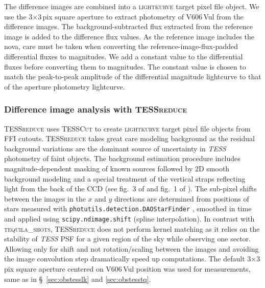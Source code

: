 \documentclass[twocolumn]{aastex631}
\newcommand{\nova}{V606\,Vul}
\begin{document}
The difference images are combined into a \textsc{lightkurve} target pixel file object. 
%
We use the 3$\times$3\,pix square aperture to extract photometry of \nova{} from the difference images.
%
The background-subtracted flux extracted from the reference image is added to the difference flux values.
As the reference image includes the nova, care must be taken when converting 
the reference-image-flux-padded differential fluxes to magnitudes. 
We add a constant value to the differential fluxes before converting them to magnitudes. 
The constant value is chosen to match the peak-to-peak amplitude of 
the differential magnitude lightcurve to that of the aperture photometry lightcurve. 


\subsubsection{Difference image analysis with \textsc{TESSreduce}}
\label{sec:obstesstr}

\textsc{TESSreduce} \citep{2021arXiv211115006R} 
uses \textsc{TESSCut} to create \textsc{lightkurve} target pixel file
objects from FFI cutouts. 
\textsc{TESSreduce} takes great care modeling background 
as the residual background variations are the dominant source of uncertainty
in {\em TESS} photometry of faint objects. The background estimation
procedure includes magnitude-dependent masking of known sources followed by
2D smooth background modeling and a special treatment of the vertical straps 
reflecting light from the back of the CCD (see fig.~3 of \citealt{2021arXiv211115006R}
and fig.~1 of \citealt{2021MNRAS.500.5639V}).
The sub-pixel shifts between the images in the $x$ and $y$ directions are
determined from positions of stars measured with 
\texttt{photutils.detection.DAOStarFinder} \citep[implementing the algorithm of][]{1987PASP...99..191S},
smoothed in time \citep[see fig.~4 of][]{2021arXiv211115006R} and applied using \texttt{scipy.ndimage.shift} (spline interpolation).
In contrast with \textsc{tequila\_shots}, \textsc{TESSreduce} does not perform kernel matching as it relies on 
the stability of {\em TESS} PSF for a given region of the sky while
observing one sector. Allowing only for shift and not rotation/scaling
between the images and avoiding the image convolution step dramatically
speed up computations. The default 3$\times$3\,pix square aperture 
centered on \nova{} position was used for measurements, 
same as in \S~\ref{sec:obstesslk} and \ref{sec:obstesstq}.
\end{document}
